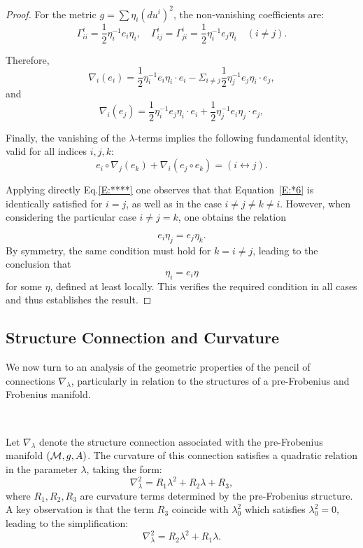 \begin{proof}
For the metric $g = \sum \eta_i (du^i)^2$, the non-vanishing coefficients are:
\[
\Gamma_{ii}^i = \frac{1}{2} \eta_i^{-1} e_i \eta_i, \quad \Gamma_{ij}^i = \Gamma_{ji}^i = \frac{1}{2} \eta_i^{-1} e_j \eta_i \quad (i \neq j).
\]


Therefore,
\[
\nabla_i(e_i)= \frac{1}{2}\eta_i^{-1}e_i \eta_i  \cdot  e_i - \Sigma_{i \neq j}\frac{1}{2} \eta_j^{-1} e_j \eta_i \cdot e_j,
\]
and 
\begin{equation}\label{E:****}
    \nabla_i(e_j)= \frac{1}{2}\eta_i^{-1}e_j \eta_i  \cdot  e_i + \frac{1}{2} \eta_j^{-1} e_i \eta_j \cdot e_j,
\end{equation}

Finally, the vanishing of the $\lambda$-terms implies the following fundamental identity, valid for all indices  $i, j, k$:
\begin{equation}\label{E:*6}
e_i \circ \nabla_j(e_k) + \nabla_i(e_j \circ e_k) = (i \leftrightarrow j).
\end{equation}

Applying directly Eq.\ref{E:****} one observes that that Equation~\ref{E:*6} is identically satisfied for $i=j$, as well as in the case $i \neq j \neq k \neq i$. However, when considering the particular case  $i \neq j = k$, one obtains the relation 

\[
e_i \eta_j = e_j \eta_k.
\]
By symmetry, the same condition must hold for $k = i \neq j$, leading to the conclusion that \[\eta_i = e_i \eta\] for some $\eta$, defined at least locally.
This verifies the required condition in all cases and thus establishes the result.
\end{proof}
\subsection{Structure Connection and Curvature} We now turn to an analysis of the geometric properties of the pencil of connections $\nabla_\lambda$, particularly in relation to the structures of a pre-Frobenius and Frobenius manifold.

\, 

Let $\nabla_\lambda$ denote the structure connection associated with the pre-Frobenius manifold 
$(\mathcal{M}, g, A)$. The curvature of this connection satisfies a quadratic relation in the parameter $\lambda$, taking the form:
\[
\nabla_\lambda^2 = R_1 \lambda^2 + R_2 \lambda + R_3,
\]
where $R_1, R_2, R_3$ are curvature terms determined by the pre-Frobenius structure. A key observation is that the term 
$R_3 $ coincide with $\lambda_0^2$ which satisfies $\lambda_0^2 = 0$,  leading to the simplification:
\[
\nabla_\lambda^2 = R_2 \lambda^2 + R_1 \lambda.
\]

